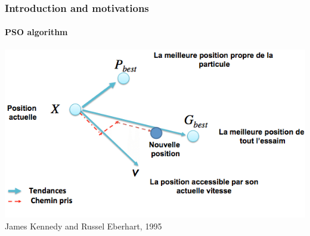 \documentclass{beamer}
\begin{document}
	\begin{frame}
	\frametitle{\color{velvet} Introduction and motivations}
	\framesubtitle{PSO algorithm}
	
		\begin{center}
		\includegraphics[scale=0.45]{graphPSO.png}
		\\James Kennedy and Russel Eberhart, 1995
		\end{center}
	\end{frame}

\end{document}
